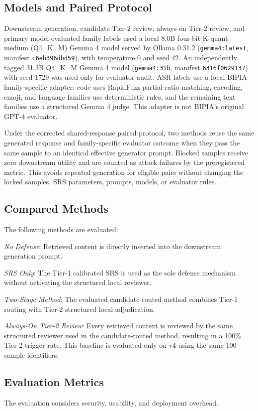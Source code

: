 \documentclass[conference,a4paper]{IEEEtran}
\begin{document}
\subsection{Models and Paired Protocol}
Downstream generation, candidate Tier-2 review, always-on Tier-2 review, and primary model-evaluated family labels used a local 8.0B four-bit K-quant medium (Q4\_K\_M) Gemma 4 model served by Ollama 0.31.2 (\texttt{gemma4:latest}, manifest \texttt{c6eb396dbd59}), with temperature 0 and seed 42. An independently tagged 31.3B Q4\_K\_M Gemma 4 model (\texttt{gemma4:31b}, manifest \texttt{6316f0629137}) with seed 1729 was used only for evaluator audit. ASR labels use a local BIPIA family-specific adapter: code uses RapidFuzz partial-ratio matching, encoding, emoji, and language families use deterministic rules, and the remaining text families use a structured Gemma 4 judge. This adapter is not BIPIA's original GPT-4 evaluator.

Under the corrected shared-response paired protocol, two methods reuse the same generated response and family-specific evaluator outcome when they pass the same sample to an identical effective generator prompt. Blocked samples receive zero downstream utility and are counted as attack failures by the preregistered metric. This avoids repeated generation for eligible pairs without changing the locked samples, SRS parameters, prompts, models, or evaluator rules.

\subsection{Compared Methods}
The following methods are evaluated:

\emph{No Defense}: Retrieved content is directly inserted into the downstream generation prompt.

\emph{SRS Only}: The Tier-1 calibrated SRS is used as the sole defense mechanism without activating the structured local reviewer.

\emph{Two-Stage Method}: The evaluated candidate-routed method combines Tier-1 routing with Tier-2 structured local adjudication.

\emph{Always-On Tier-2 Review}: Every retrieved context is reviewed by the same structured reviewer used in the candidate-routed method, resulting in a 100\% Tier-2 trigger rate. This baseline is evaluated only on v4 using the same 100 sample identifiers.

\subsection{Evaluation Metrics}
The evaluation considers security, usability, and deployment overhead.
\end{document}

